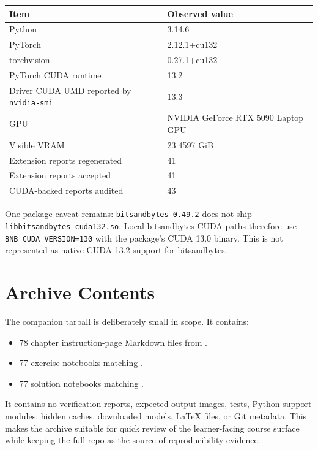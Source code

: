 \documentclass[11pt]{article}
\newcommand{\code}[1]{\texttt{#1}}
\begin{document}
\begin{center}
\begin{tabular}{@{}ll@{}}
\toprule
Item & Observed value \\
\midrule
Python & 3.14.6 \\
PyTorch & 2.12.1+cu132 \\
torchvision & 0.27.1+cu132 \\
PyTorch CUDA runtime & 13.2 \\
Driver CUDA UMD reported by \code{nvidia-smi} & 13.3 \\
GPU & NVIDIA GeForce RTX 5090 Laptop GPU \\
Visible VRAM & 23.4597 GiB \\
Extension reports regenerated & 41 \\
Extension reports accepted & 41 \\
CUDA-backed reports audited & 43 \\
\bottomrule
\end{tabular}
\end{center}

One package caveat remains: \code{bitsandbytes 0.49.2} does not ship
\code{libbitsandbytes\_cuda132.so}. Local bitsandbytes CUDA paths therefore use
\code{BNB\_CUDA\_VERSION=130} with the package's CUDA 13.0 binary. This is not
represented as native CUDA 13.2 support for bitsandbytes.

\section{Archive Contents}
The companion tarball is deliberately small in scope. It contains:
\begin{itemize}
  \item 78 chapter instruction-page Markdown files from
  .
  \item 77 exercise notebooks matching .
  \item 77 solution notebooks matching .
\end{itemize}
It contains no verification reports, expected-output images, tests, Python
support modules, hidden caches, downloaded models, LaTeX files, or Git metadata.
This makes the archive suitable for quick review of the learner-facing course
surface while keeping the full repo as the source of reproducibility evidence.
\end{document}

